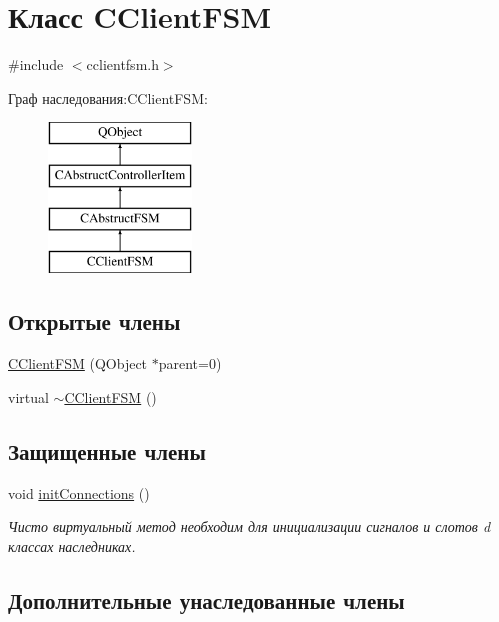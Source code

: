 \hypertarget{class_c_client_f_s_m}{}\section{Класс C\+Client\+F\+SM}
\label{class_c_client_f_s_m}


{\ttfamily \#include $<$cclientfsm.\+h$>$}

Граф наследования\+:C\+Client\+F\+SM\+:\begin{figure}[H]
\begin{center}
\leavevmode
\includegraphics[height=4.000000cm]{class_c_client_f_s_m}
\end{center}
\end{figure}
\subsection*{Открытые члены}
\begin{DoxyCompactItemize}
\item 
\hyperlink{class_c_client_f_s_m_ad5cde8ac83f83aa722a1739bdf46a453}{C\+Client\+F\+SM} (Q\+Object $\ast$parent=0)
\item 
virtual \hyperlink{class_c_client_f_s_m_acd28280c438e234e05340ddb46472c2d}{$\sim$\+C\+Client\+F\+SM} ()
\end{DoxyCompactItemize}
\subsection*{Защищенные члены}
\begin{DoxyCompactItemize}
\item 
void \hyperlink{class_c_client_f_s_m_aaf6b857e9a5d2b2f55b71212e74fd4cb}{init\+Connections} ()
\begin{DoxyCompactList}\small\item\em Чисто виртуальный метод необходим для инициализации сигналов и слотов d классах наследниках. \end{DoxyCompactList}\end{DoxyCompactItemize}
\subsection*{Дополнительные унаследованные члены}


